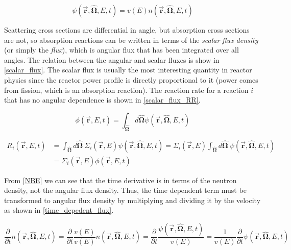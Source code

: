 \begin{equation}
\label{ang_flux}
\psi(\boldsymbol{\vec{r}},\boldsymbol{\hat{\Omega}},E,t) = v(E) n(\boldsymbol{\vec{r}},\boldsymbol{\hat{\Omega}},E,t)
\end{equation}

Scattering cross sections are differential in angle, but absorption cross sections are not, so absorption reactions can be written in terms of the \emph{scalar flux density} (or simply the \emph{flux}), which is angular flux that has been integrated over all angles.  The relation between the angular and scalar fluxes is show in \eqref{scalar_flux}.  The scalar flux is usually the most interesting quantity in reactor physics since the reactor power profile is directly proportional to it (power comes from fission, which is an absorption reaction).  The reaction rate for a reaction $i$ that has no angular dependence is shown in \eqref{scalar_flux_RR}.

\begin{equation}
\label{scalar_flux}
\phi(\boldsymbol{\vec{r}},E,t) = \int_{\boldsymbol{\hat{\Omega}}} d\boldsymbol{\hat{\Omega}} \psi(\boldsymbol{\vec{r}},\boldsymbol{\hat{\Omega}},E,t)
\end{equation}

\begin{align}
\label{scalar_flux_RR}
 R_i(\boldsymbol{\vec{r}},E,t) &= \int_{\boldsymbol{\hat{\Omega}}} d\boldsymbol{\hat{\Omega}} \: \Sigma_i(\boldsymbol{\vec{r}},E) \psi(\boldsymbol{\vec{r}},\boldsymbol{\hat{\Omega}},E,t) = \Sigma_i(\boldsymbol{\vec{r}},E) \int_{\boldsymbol{\hat{\Omega}}} d\boldsymbol{\hat{\Omega}} \: \psi(\boldsymbol{\vec{r}},\boldsymbol{\hat{\Omega}},E,t) \nonumber\\
 &= \Sigma_i(\boldsymbol{\vec{r}},E) \phi(\boldsymbol{\vec{r}},E,t)
 \end{align}
 
From \eqref{NBE} we can see that the time derivative is in terms of the neutron density, not the angular flux density.  Thus, the time dependent term must be transformed to angular flux density by multiplying and dividing it by the velocity as shown in \eqref{time_depedent_flux}.

\begin{equation}
\label{time_depedent_flux}
\frac{\partial }{\partial t}n(\boldsymbol{\vec{r}},\boldsymbol{\hat{\Omega}},E,t) = \frac{\partial }{\partial t}  \frac{v(E)}{v(E)} n(\boldsymbol{\vec{r}},\boldsymbol{\hat{\Omega}},E,t) =  \frac{\partial }{\partial t}  \frac{\psi(\boldsymbol{\vec{r}},\boldsymbol{\hat{\Omega}},E,t)}{v(E)} = \frac{1}{v(E)} \frac{\partial }{\partial t}\psi(\boldsymbol{\vec{r}},\boldsymbol{\hat{\Omega}},E,t)
\end{equation}


